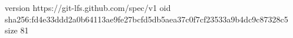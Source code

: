 version https://git-lfs.github.com/spec/v1
oid sha256:fd4e33ddd2a0b64113ae9fe27bcfd5db5aea37c0f7cf23533a9b4dc9c87328c5
size 81
